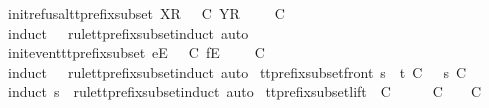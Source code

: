 %
\endisadelimproof
\isanewline
{}\isamarkupfalse%
\ init{\isacharunderscore}refusal{\isacharunderscore}tt{\isacharunderscore}prefix{\isacharunderscore}subset{\isacharcolon}\ {\isachardoublequoteopen}{\isacharbrackleft}X{\isacharbrackright}\isactrlsub R\ {\isacharhash}\ {\isasymrho}\ {\isasymlesssim}\isactrlsub C\ {\isacharbrackleft}Y{\isacharbrackright}\isactrlsub R\ {\isacharhash}\ {\isasymsigma}\ {\isasymLongrightarrow}\ {\isasymrho}\ {\isasymlesssim}\isactrlsub C\ {\isasymsigma}{\isachardoublequoteclose}\isanewline
%
\isadelimproof
\ \ %
\endisadelimproof
%
\isatagproof
{}\isamarkupfalse%
\ {\isacharparenleft}induct\ {\isasymrho}\ {\isasymsigma}\ rule{\isacharcolon}tt{\isacharunderscore}prefix{\isacharunderscore}subset{\isachardot}induct{\isacharcomma}\ auto{\isacharparenright}%
\endisatagproof
{\isafoldproof}%
%
\isadelimproof
\isanewline
%
\endisadelimproof
\isanewline
{}\isamarkupfalse%
\ init{\isacharunderscore}event{\isacharunderscore}tt{\isacharunderscore}prefix{\isacharunderscore}subset{\isacharcolon}\ {\isachardoublequoteopen}{\isacharbrackleft}e{\isacharbrackright}\isactrlsub E\ {\isacharhash}\ {\isasymrho}\ {\isasymlesssim}\isactrlsub C\ {\isacharbrackleft}f{\isacharbrackright}\isactrlsub E\ {\isacharhash}\ {\isasymsigma}\ {\isasymLongrightarrow}\ {\isasymrho}\ {\isasymlesssim}\isactrlsub C\ {\isasymsigma}{\isachardoublequoteclose}\isanewline
%
\isadelimproof
\ \ %
\endisadelimproof
%
\isatagproof
{}\isamarkupfalse%
\ {\isacharparenleft}induct\ {\isasymrho}\ {\isasymsigma}\ rule{\isacharcolon}tt{\isacharunderscore}prefix{\isacharunderscore}subset{\isachardot}induct{\isacharcomma}\ auto{\isacharparenright}%
\endisatagproof
{\isafoldproof}%
%
\isadelimproof
\isanewline
%
\endisadelimproof
\isanewline
{}\isamarkupfalse%
\ tt{\isacharunderscore}prefix{\isacharunderscore}subset{\isacharunderscore}front{\isacharcolon}\ {\isachardoublequoteopen}s\ {\isacharat}\ t\ {\isasymlesssim}\isactrlsub C\ {\isasymsigma}\ {\isasymLongrightarrow}\ s\ {\isasymlesssim}\isactrlsub C\ {\isasymsigma}{\isachardoublequoteclose}\isanewline
%
\isadelimproof
\ \ %
\endisadelimproof
%
\isatagproof
{}\isamarkupfalse%
\ {\isacharparenleft}induct\ s\ {\isasymsigma}\ rule{\isacharcolon}tt{\isacharunderscore}prefix{\isacharunderscore}subset{\isachardot}induct{\isacharcomma}\ auto{\isacharparenright}%
\endisatagproof
{\isafoldproof}%
%
\isadelimproof
\isanewline
%
\endisadelimproof
\isanewline
{}\isamarkupfalse%
\ tt{\isacharunderscore}prefix{\isacharunderscore}subset{\isacharunderscore}lift{\isacharcolon}\ {\isachardoublequoteopen}{\isasymrho}\ {\isasymlesssim}\isactrlsub C\ {\isasymsigma}\ {\isasymLongrightarrow}\ {\isasymexists}\ {\isasymrho}{\isacharprime}{\isachardot}\ {\isasymrho}{\isacharprime}\ {\isasymle}\isactrlsub C\ {\isasymsigma}\ {\isasymand}\ {\isasymrho}\ {\isasymlesssim}\isactrlsub C\ {\isasymrho}{\isacharprime}{\isachardoublequoteclose}\isanewline
